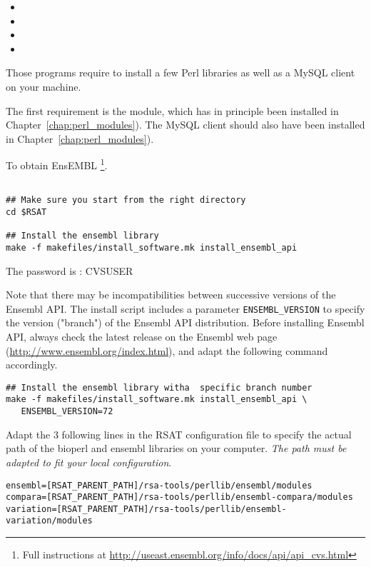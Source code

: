 \documentclass[12pt,a4paper, oneside]{scrreprt} %
\begin{document}
\begin{itemize}
\item {}
\item {}
\item {} 
\item {}
\end{itemize}

Those programs require to install a few Perl libraries as well as a
MySQL client on your machine. 

The first requirement is the  module, which has in
principle been installed in Chapter~\ref{chap:perl_modules}). The MySQL client should also have been installed in Chapter~\ref{chap:perl_modules}).


To obtain EnsEMBL \footnote{Full instructions at
  \url{http://useast.ensembl.org/info/docs/api/api_cvs.html}}.

\begin{lstlisting}

## Make sure you start from the right directory
cd $RSAT

## Install the ensembl library
make -f makefiles/install_software.mk install_ensembl_api 
\end{lstlisting}

The password is : CVSUSER


Note that there may be incompatibilities between successive versions
of the Ensembl API. The install script includes a parameter
\texttt{ENSEMBL\_VERSION} to specify the version ("branch") of the
Ensembl API distribution. Before installing Ensembl API, always check
the latest release on the Ensembl web page
(\url{http://www.ensembl.org/index.html}), and adapt the following
command accordingly.

\begin{lstlisting}
## Install the ensembl library witha  specific branch number
make -f makefiles/install_software.mk install_ensembl_api \
   ENSEMBL_VERSION=72
\end{lstlisting}

Adapt the 3 following lines in the RSAT configuration file
 to specify the actual path of the bioperl
and ensembl libraries on your computer. \emph{The path must be adapted
  to fit your local configuration}.

\begin{lstlisting}
ensembl=[RSAT_PARENT_PATH]/rsa-tools/perllib/ensembl/modules
compara=[RSAT_PARENT_PATH]/rsa-tools/perllib/ensembl-compara/modules
variation=[RSAT_PARENT_PATH]/rsa-tools/perllib/ensembl-variation/modules
\end{lstlisting}
\end{document}
